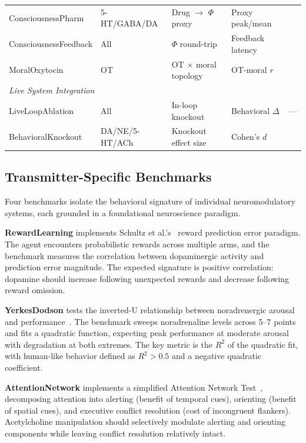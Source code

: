 \documentclass[11pt,letterpaper]{article}
\begin{document}
\begin{table}[t]
\begin{tabular}{@{}p{2.4cm}p{2.0cm}p{2.2cm}p{2.2cm}p{2.8cm}@{}}
ConsciousnessPharm & 5-HT/GABA/DA & Drug $\to$ $\Phi$ proxy & Proxy peak/mean & \citet{tononi2004information} \\
ConsciousnessFeedback & All & $\Phi$ round-trip & Feedback latency & \citet{oizumi2014phenomenology} \\
MoralOxytocin & OT & OT $\times$ moral topology & OT-moral $r$ & \citet{feldman2012oxytocin} \\
\midrule
\multicolumn{5}{l}{\emph{Live System Integration}} \\
LiveLoopAblation & All & In-loop knockout & Behavioral $\Delta$ & --- \\
BehavioralKnockout & DA/NE/5-HT/ACh & Knockout effect size & Cohen's $d$ & \citet{doya2002metalearning} \\
\bottomrule
\end{tabular}
\end{table}

\subsection{Transmitter-Specific Benchmarks}

Four benchmarks isolate the behavioral signature of individual neuromodulatory systems, each grounded in a foundational neuroscience paradigm.

\textbf{RewardLearning} implements Schultz et al.'s~\citep{schultz1997dopamine} reward prediction error paradigm. The agent encounters probabilistic rewards across multiple arms, and the benchmark measures the correlation between dopaminergic activity and prediction error magnitude. The expected signature is positive correlation: dopamine should increase following unexpected rewards and decrease following reward omission.

\textbf{YerkesDodson} tests the inverted-U relationship between noradrenergic arousal and performance~\citep{yerkes1908relation}. The benchmark sweeps noradrenaline levels across 5--7 points and fits a quadratic function, expecting peak performance at moderate arousal with degradation at both extremes. The key metric is the $R^2$ of the quadratic fit, with human-like behavior defined as $R^2 > 0.5$ and a negative quadratic coefficient.

\textbf{AttentionNetwork} implements a simplified Attention Network Test~\citep{posner1990attention}, decomposing attention into alerting (benefit of temporal cues), orienting (benefit of spatial cues), and executive conflict resolution (cost of incongruent flankers). Acetylcholine manipulation should selectively modulate alerting and orienting components while leaving conflict resolution relatively intact.
\end{document}
